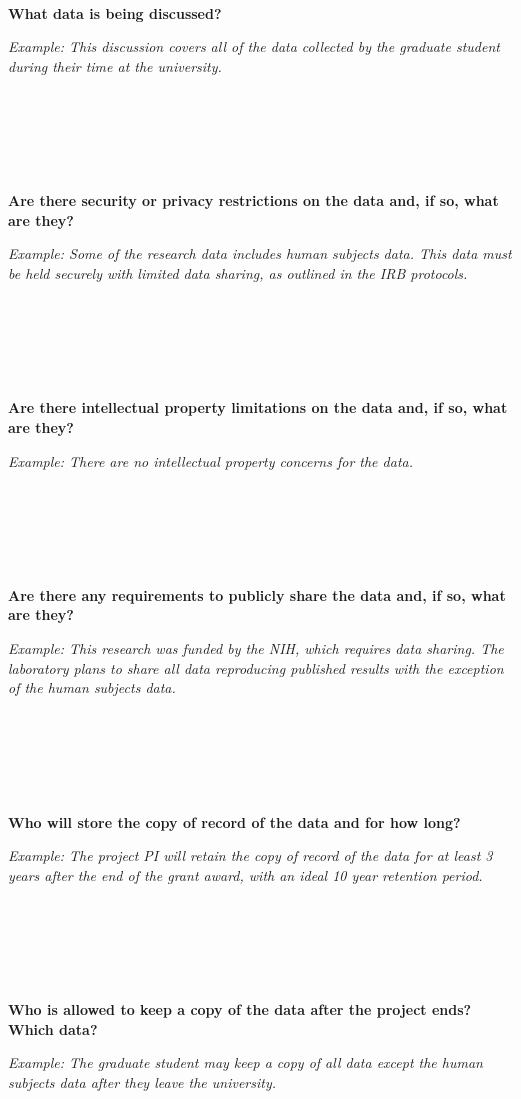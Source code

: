 \documentclass[
]{book}
\begin{document}
~

\textbf{What data is being discussed?}

\emph{Example: This discussion covers all of the data collected by the graduate student during their time at the university.}

~

~

~

\textbf{Are there security or privacy restrictions on the data and, if so, what are they?}

\emph{Example: Some of the research data includes human subjects data. This data must be held securely with limited data sharing, as outlined in the IRB protocols.}

~

~

~

\textbf{Are there intellectual property limitations on the data and, if so, what are they?}

\emph{Example: There are no intellectual property concerns for the data.}

~

~

~

\textbf{Are there any requirements to publicly share the data and, if so, what are they?}

\emph{Example: This research was funded by the NIH, which requires data sharing. The laboratory plans to share all data reproducing published results with the exception of the human subjects data.}

~

~

~

\textbf{Who will store the copy of record of the data and for how long?}

\emph{Example: The project PI will retain the copy of record of the data for at least 3 years after the end of the grant award, with an ideal 10 year retention period.}

~

~

~

\textbf{Who is allowed to keep a copy of the data after the project ends? Which data?}

\emph{Example: The graduate student may keep a copy of all data except the human subjects data after they leave the university.}

~

~

~
\end{document}
